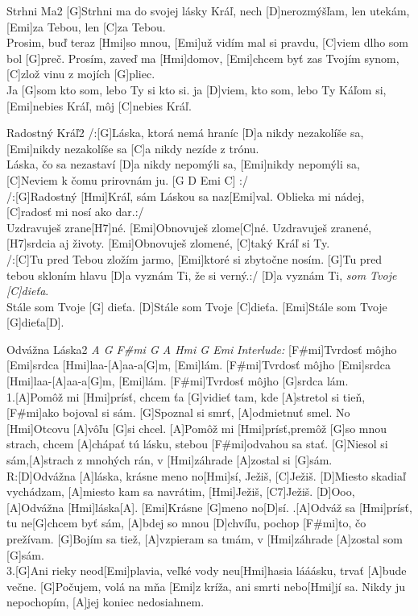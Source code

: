 \documentclass[12pt]{article}
\begin{document}
\begin{song}{Strhni Ma}{2}
	[G]Strhni ma do svojej lásky Kráľ,
	nech [D]nerozmýšľam, len utekám,
	[Emi]za Tebou, len [C]za Tebou.
	\\
	[G]Prosim, buď teraz [Hmi]so mnou,
	[Emi]už vidím mal si pravdu,
	[C]viem dlho som bol [G]preč.
	\columnbreak
	Prosím, zaveď ma [Hmi]domov,
	[Emi]chcem byť zas Tvojím synom,
	[C]zlož vinu z mojích [G]pliec.
	\\
	Ja [G]som kto som, lebo Ty si kto si.
	ja [D]viem, kto som, lebo Ty Káľom si,
	[Emi]nebies Kráľ, môj [C]nebies Kráľ.
\end{song}

\begin{song}{Radostný Kráľ}{2}
/:[G]Láska, ktorá nemá hraníc
[D]a nikdy nezakolíše sa,
[Emi]nikdy nezakolíše sa
[C]a nikdy nezíde z trónu.
\\
[G]Láska, čo sa nezastaví
[D]a nikdy nepomýli sa,
[Emi]nikdy nepomýli sa,
[C]Neviem k čomu prirovnám ju. 
[G D Emi C] :/ 
\\
/:[G]Radostný [Hmi]Kráľ,
sám Láskou sa naz[Emi]val.
Oblieka mi nádej,
[C]radosť mi nosí ako dar.:/
\\
[G]Uzdravuješ zrane[H7]né.
[Emi]Obnovuješ zlome[C]né. 
\columnbreak
[G]Uzdravuješ zranené, 
[H7]srdcia aj životy.
[Emi]Obnovuješ zlomené, 
[C]taký Kráľ si Ty.
\\
/:[C]Tu pred Tebou zložím jarmo,
[Emi]ktoré si zbytočne nosím.
[G]Tu pred tebou skloním hlavu
[D]a vyznám Ti, že si verný.:/
[D]a vyznám Ti, \textit{som Tvoje [C]dieťa}.
\\
[Emi]Stále som Tvoje [G] dieťa.
[D]Stále som Tvoje [C]dieťa.
[Emi]Stále som Tvoje [G]dieťa[D].
\end{song}

\begin{song}{Odvážna Láska}{2}
	\textit{A G F\#mi G A Hmi G Emi}
	\textit{\color{gray}Interlude:}
	[F#mi]Tvrdosť môjho [Emi]srdca [Hmi]laa-[A]aa-a[G]m, [Emi]lám.
	[F#mi]Tvrdosť môjho [Emi]srdca [Hmi]laa-[A]aa-a[G]m, [Emi]lám.
	[F#mi]Tvrdosť môjho [G]srdca lám.
	\\
	1.[A]Pomôž mi [Hmi]prísť, chcem ťa [G]vidieť tam, 
	kde [A]stretol si tieň, [F#mi]ako bojoval si sám.
	[G]Spoznal si smrť, [A]odmietnuť smel.
	No [Hmi]Otcovu [A]vôľu [G]si chcel.
	[A]Pomôž mi [Hmi]prísť,premôž [G]so mnou strach, 
	chcem [A]chápať tú lásku, 
	stebou [F#mi]odvahou sa stať.
	[G]Niesol si sám,[A]strach z mnohých rán,
	v [Hmi]záhrade [A]zostal si [G]sám.
	\\
	R:[D]Odvážna [A]láska, 
	krásne meno no[Hmi]sí, Ježiš, [C]Ježiš.
	[D]Miesto skadiaľ vychádzam, 
	[A]miesto kam sa navrátim, [Hmi]Ježiš, [C7]Ježiš.	
	{\color{gray}[D]Ooo, [A]Odvážna [Hmi]láska[A]. [Emi]Krásne [G]meno no[D]sí.}
	.[A]Odváž sa [Hmi]prísť, tu ne[G]chcem byť sám,
	[A]bdej so mnou [D]chvíľu, pochop 
	[F#mi]to, čo prežívam.
	[G]Bojím sa tiež,
	[A]vzpieram sa tmám, 
	v [Hmi]záhrade [A]zostal som [G]sám.
	\\
	3.[G]Ani rieky neod[Emi]plavia, 
	veľké vody neu[Hmi]hasia lááásku,
	trvať [A]bude večne.
	[G]Počujem, volá na mňa [Emi]z kríža,
	ani smrti nebo[Hmi]jí sa.
	Nikdy ju nepochopím, 
	[A]jej koniec nedosiahnem.
\end{song}
\end{document}
